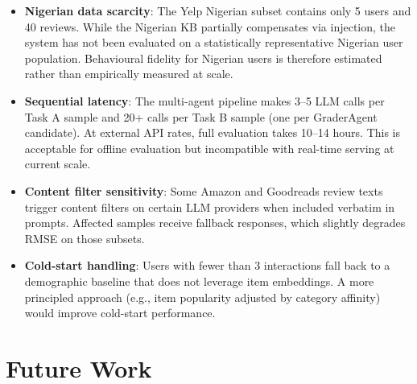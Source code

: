 \documentclass[11pt,a4paper]{article}
\begin{document}
\begin{itemize}[leftmargin=*]
    \item \textbf{Nigerian data scarcity}: The Yelp Nigerian subset contains only 5 users and 40 reviews. While the Nigerian KB partially compensates via injection, the system has not been evaluated on a statistically representative Nigerian user population. Behavioural fidelity for Nigerian users is therefore estimated rather than empirically measured at scale.

    \item \textbf{Sequential latency}: The multi-agent pipeline makes 3–5 LLM calls per Task A sample and 20+ calls per Task B sample (one per GraderAgent candidate). At external API rates, full evaluation takes 10–14 hours. This is acceptable for offline evaluation but incompatible with real-time serving at current scale.

    \item \textbf{Content filter sensitivity}: Some Amazon and Goodreads review texts trigger content filters on certain LLM providers when included verbatim in prompts. Affected samples receive fallback responses, which slightly degrades RMSE on those subsets.

    \item \textbf{Cold-start handling}: Users with fewer than 3 interactions fall back to a demographic baseline that does not leverage item embeddings. A more principled approach (e.g., item popularity adjusted by category affinity) would improve cold-start performance.
\end{itemize}

\section{Future Work}
\end{document}
